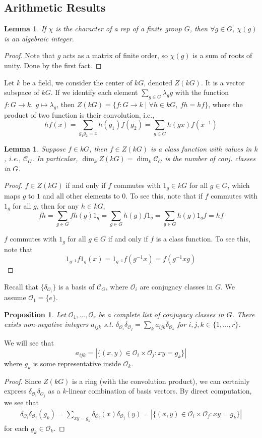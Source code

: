 \documentclass{article}
\theoremstyle{definition}
\theoremstyle{remark}
\theoremstyle{plain}
\newtheorem{lem}[defn]{Lemma}
\newtheorem{prop}[defn]{Proposition}
\begin{document}
\subsection{Arithmetic Results}
\begin{lem}
    If $\chi$ is the character of a rep of a finite group $G$, then $\forall g\in G,\ \chi(g)$ is an algebraic integer.
\end{lem}
\begin{proof}
    Note that $g$ acts as a matrix of finite order, so $\chi(g)$ is a sum of roots of unity. Done by the first fact.
\end{proof}
Let $k$ be a field, we consider the center of $kG$, denoted $Z(kG)$. It is a vector subspace of $kG$. If we identify each element $\sum_{g\in G}\lambda_gg$ with the function $f:G\to k,\ g\mapsto\lambda_g$, then $Z(kG)=\{f:G\to k\mid \forall h\in kG,\ fh=hf\}$, where the product of two function is their convolution, i.e., $$hf(x)=\sum_{g_1g_2=x}h(g_1)f(g_2)=\sum_{g\in G}h(gx)f(x^{-1})$$
\begin{lem}
    Suppose $f\in kG$, then $f\in Z(kG)$ is a class function with values in $k$, i.e., $\mathcal{C}_G$. In particular, $\dim_k Z(kG)=\dim_k\mathcal{C}_G$ is the number of conj. classes in $G$.
\end{lem}
\begin{proof}
    $f\in Z(kG)$ if and only if $f$ commutes with $1_g\in kG$ for all $g\in G$, which maps $g$ to $1$ and all other elements to $0$. To see this, note that if $f$ commutes with $1_g$ for all $g$, then for any $h\in kG$,
    \[fh=\sum_{g\in G}fh(g)1_g=\sum_{g\in G}h(g)f1_g=\sum_{g\in G}h(g)1_gf=hf\]

    $f$ commutes with $1_g$ for all $g\in G$ if and only if $f$ is a class function. To see this, note that $$1_{g^{-1}}f1_g(x)=1_{g^{-1}}f(g^{-1}x)=f(g^{-1}xg)$$
\end{proof}
Recall that $\{\delta_{\mathcal O_i}\}$ is a basis of $\mathcal C_G$, where $\mathcal O_i$ are conjugacy classes in $G$. We assume $\mathcal O_1=\{e\}$.
\begin{prop}
    Let $\mathcal O_1,...,\mathcal O_r$ be a complete list of conjugacy classes in $G$. There exists non-negative integers $a_{ijk}$ s.t. $\delta_{\mathcal O_i}\delta_{\mathcal O_j}=\sum_{k}a_{ijk}\delta_{\mathcal O_k}$ for $i,j,k\in\{1,...,r\}$.
\end{prop}
We will see that
\[a_{ijk}=|\{(x,y)\in\mathcal O_i\times\mathcal O_j:xy=g_k\}|\]
where $g_k$ is some representative inside $\mathcal{O}_k$.
\begin{proof}
    Since $Z(kG)$ is a ring (with the convolution product), we can certainly express $\delta_{\mathcal O_i}\delta_{\mathcal O_j}$ as a $k$-linear combination of basis vectors. By direct computation, we see that
    \begin{align*}
        \delta_{\mathcal O_i}\delta_{\mathcal O_j}(g_k)=\sum_{xy=g_k}\delta_{\mathcal O_i}(x)\delta_{\mathcal O_j}(y)=|\{(x,y)\in\mathcal O_i\times\mathcal O_j:xy=g_k\}|
    \end{align*}
    for each $g_k\in\mathcal O_k$.
\end{proof}
\end{document}
